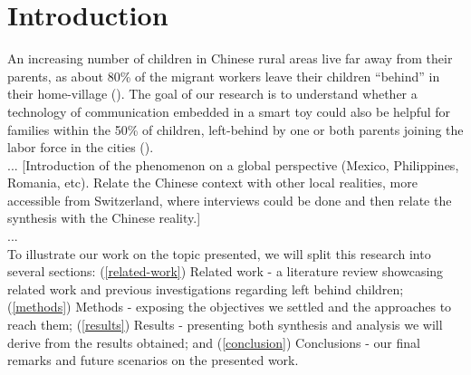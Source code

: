 \section{Introduction}


An increasing number of children in Chinese rural areas live far away from their parents, as about 80\% of the migrant workers leave their children “behind” in their home-village (\cite{guo2017effect}). The goal of our research is to understand whether a technology of communication embedded in a smart toy could also be helpful for families within the 50\% of children, left-behind by one or both parents joining the labor force in the cities (\cite{bai2017effect}).\\
...
[Introduction of the phenomenon on a global perspective (Mexico, Philippines, Romania, etc). Relate the Chinese context with other local realities, more accessible from Switzerland, where interviews could be done and then relate the synthesis with the Chinese reality.]\\
...\\


To illustrate our work on the topic presented, we will split this research into several sections: (\ref{related-work}) Related work - a literature review showcasing related work and previous investigations regarding left behind children; (\ref{methods}) Methods - exposing the objectives we settled and the approaches to reach them; (\ref{results}) Results - presenting both synthesis and analysis we will derive from the results obtained; and (\ref{conclusion}) Conclusions - our final remarks and future scenarios on the presented work.

